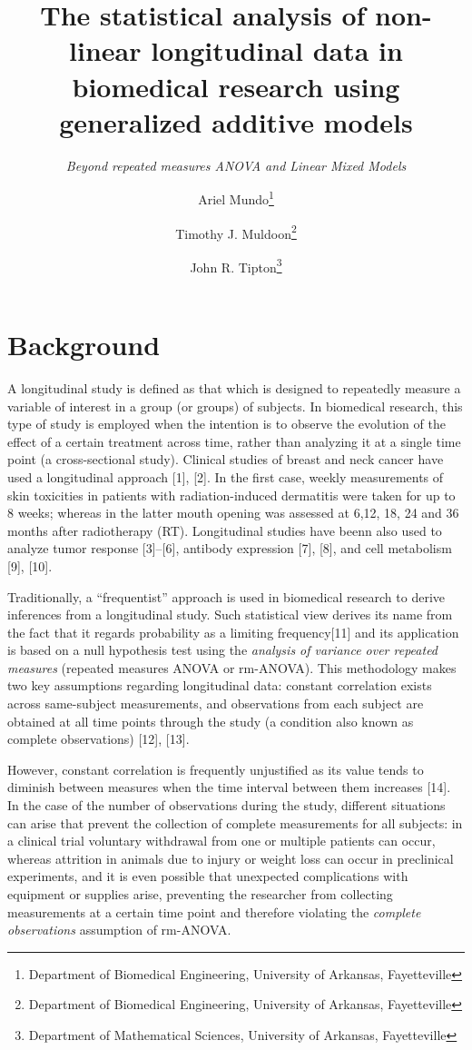 \documentclass[
]{article}
\title{\textbf{The statistical analysis of non-linear longitudinal data in biomedical research using generalized additive models}}
\subtitle{\emph{Beyond repeated measures ANOVA and Linear Mixed Models}}
\author{Ariel Mundo\footnote{Department of Biomedical Engineering, University of Arkansas, Fayetteville} \and Timothy J. Muldoon\footnote{Department of Biomedical Engineering, University of Arkansas, Fayetteville} \and John R. Tipton\footnote{Department of Mathematical Sciences, University of Arkansas, Fayetteville}}
\date{}
\begin{document}
\maketitle

{
\setcounter{tocdepth}{2}
\tableofcontents
}
\hypertarget{background}{%
\section{Background}\label{background}}

A longitudinal study is defined as that which is designed to repeatedly measure a variable of interest in a group (or groups) of subjects. In biomedical research, this type of study is employed when the intention is to observe the evolution of the effect of a certain treatment across time, rather than analyzing it at a single time point (a cross-sectional study). Clinical studies of breast and neck cancer have used a longitudinal approach {[}1{]}, {[}2{]}. In the first case, weekly measurements of skin toxicities in patients with radiation-induced dermatitis were taken for up to 8 weeks; whereas in the latter mouth opening was assessed at 6,12, 18, 24 and 36 months after radiotherapy (RT). Longitudinal studies have beenn also used to analyze tumor response {[}3{]}--{[}6{]}, antibody expression {[}7{]}, {[}8{]}, and cell metabolism {[}9{]}, {[}10{]}.

Traditionally, a ``frequentist'' approach is used in biomedical research to derive inferences from a longitudinal study. Such statistical view derives its name from the fact that it regards probability as a limiting frequency{[}11{]} and its application is based on a null hypothesis test using the \emph{analysis of variance over repeated measures} (repeated measures ANOVA or rm-ANOVA). This methodology makes two key assumptions regarding longitudinal data: constant correlation exists across same-subject measurements, and observations from each subject are obtained at all time points through the study (a condition also known as complete observations) {[}12{]}, {[}13{]}.

However, constant correlation is frequently unjustified as its value tends to diminish between measures when the time interval between them increases {[}14{]}.
In the case of the number of observations during the study, different situations can arise that prevent the collection of complete measurements for all subjects: in a clinical trial voluntary withdrawal from one or multiple patients can occur, whereas attrition in animals due to injury or weight loss can occur in preclinical experiments, and it is even possible that unexpected complications with equipment or supplies arise, preventing the researcher from collecting measurements at a certain time point and therefore violating the \emph{complete observations} assumption of rm-ANOVA.
\end{document}
